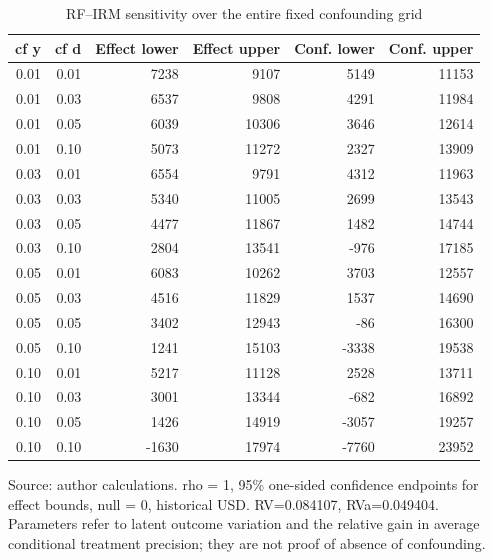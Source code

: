 \begin{table}[htbp]
\centering
\footnotesize
\caption{RF–IRM sensitivity over the entire fixed confounding grid}
\begin{tabularx}{\linewidth}{rrrrrr}
\toprule
cf y & cf d & Effect lower & Effect upper & Conf. lower & Conf. upper \\
\midrule
0.01 & 0.01 & 7238 & 9107 & 5149 & 11153 \\
0.01 & 0.03 & 6537 & 9808 & 4291 & 11984 \\
0.01 & 0.05 & 6039 & 10306 & 3646 & 12614 \\
0.01 & 0.10 & 5073 & 11272 & 2327 & 13909 \\
0.03 & 0.01 & 6554 & 9791 & 4312 & 11963 \\
0.03 & 0.03 & 5340 & 11005 & 2699 & 13543 \\
0.03 & 0.05 & 4477 & 11867 & 1482 & 14744 \\
0.03 & 0.10 & 2804 & 13541 & -976 & 17185 \\
0.05 & 0.01 & 6083 & 10262 & 3703 & 12557 \\
0.05 & 0.03 & 4516 & 11829 & 1537 & 14690 \\
0.05 & 0.05 & 3402 & 12943 & -86 & 16300 \\
0.05 & 0.10 & 1241 & 15103 & -3338 & 19538 \\
0.10 & 0.01 & 5217 & 11128 & 2528 & 13711 \\
0.10 & 0.03 & 3001 & 13344 & -682 & 16892 \\
0.10 & 0.05 & 1426 & 14919 & -3057 & 19257 \\
0.10 & 0.10 & -1630 & 17974 & -7760 & 23952 \\
\bottomrule
\end{tabularx}
\par\vspace{3pt}\begin{minipage}{\linewidth}\footnotesize Source: author calculations.\allowbreak{} rho = 1, 95\% one-sided confidence endpoints for effect bounds, null = 0, historical USD.\allowbreak{} RV=0.\allowbreak{}084107, RVa=0.\allowbreak{}049404.\allowbreak{} Parameters refer to latent outcome variation and the relative gain in average conditional treatment precision; they are not proof of absence of confounding.\allowbreak{}\end{minipage}
\end{table}
